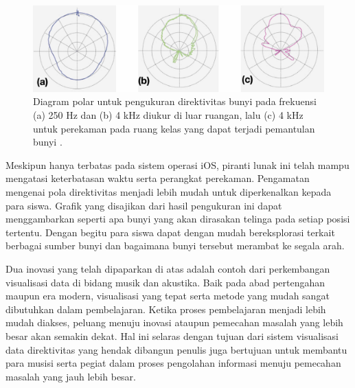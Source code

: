 \begin{figure}[h!]
    \centering
    \includegraphics[width=14cm]{Gambar/ContohPolarPlotter.jpg}
    \caption{Diagram polar untuk pengukuran direktivitas bunyi pada frekuensi (a) 250 Hz dan (b) 4 kHz diukur di luar ruangan, lalu (c) 4 kHz untuk perekaman pada ruang kelas yang dapat terjadi pemantulan bunyi \cite{PakeHP}.}
    \label{fig:contohPolarplotter}
\end{figure}
\newpage
Meskipun hanya terbatas pada sistem operasi iOS, piranti lunak ini telah mampu mengatasi keterbatasan waktu serta perangkat perekaman. Pengamatan mengenai pola direktivitas menjadi lebih mudah untuk diperkenalkan kepada para siswa. Grafik yang disajikan dari hasil pengukuran ini dapat menggambarkan seperti apa bunyi yang akan dirasakan telinga pada setiap posisi tertentu. Dengan begitu para siswa dapat dengan mudah bereksplorasi terkait berbagai sumber bunyi dan bagaimana bunyi tersebut merambat ke segala arah.  \par 
Dua inovasi yang telah dipaparkan di atas adalah contoh dari perkembangan visualisasi data di bidang musik dan akustika. Baik pada abad pertengahan maupun era modern, visualisasi yang tepat serta metode yang mudah sangat dibutuhkan dalam pembelajaran. Ketika proses pembelajaran menjadi lebih mudah diakses, peluang menuju inovasi ataupun pemecahan masalah yang lebih besar akan semakin dekat. Hal ini selaras dengan tujuan dari sistem visualisasi data direktivitas \bundengan yang hendak dibangun penulis juga bertujuan untuk membantu para musisi serta pegiat \bundengan dalam proses pengolahan informasi menuju pemecahan masalah yang jauh lebih besar. \par 


